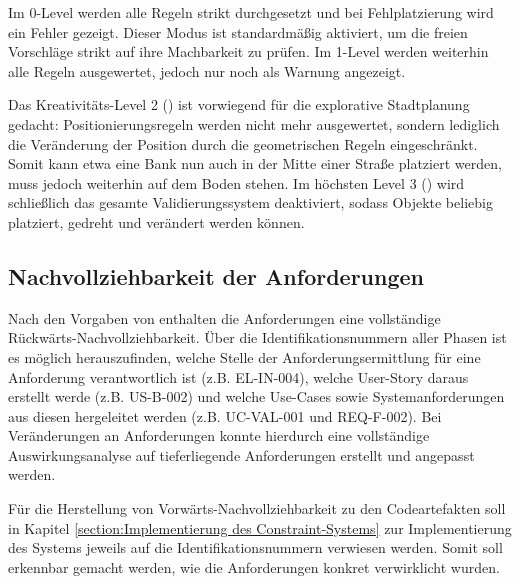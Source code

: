 Im 0-Level werden alle Regeln strikt durchgesetzt und bei Fehlplatzierung wird ein Fehler gezeigt. Dieser Modus ist standardmäßig aktiviert, um die freien Vorschläge strikt auf ihre Machbarkeit zu prüfen. Im 1-Level werden weiterhin alle Regeln ausgewertet, jedoch nur noch als Warnung angezeigt.

Das Kreativitäts-Level 2 () ist vorwiegend für die explorative Stadtplanung gedacht: Positionierungsregeln werden nicht mehr ausgewertet, sondern lediglich die Veränderung der Position durch die geometrischen Regeln eingeschränkt. Somit kann etwa eine Bank nun auch in der Mitte einer Straße platziert werden, muss jedoch weiterhin auf dem Boden stehen. Im höchsten Level 3 () wird schließlich das gesamte Validierungssystem deaktiviert, sodass Objekte beliebig platziert, gedreht und verändert werden können.

\subsection{Nachvollziehbarkeit der Anforderungen}

Nach den Vorgaben von \textcite{ruppRequirementsEngineeringUndManagement2021} enthalten die Anforderungen eine vollständige Rückwärts-Nachvollziehbarkeit. Über die Identifikationsnummern aller Phasen ist es möglich herauszufinden, welche Stelle der Anforderungsermittlung für eine Anforderung verantwortlich ist (z.B. EL-IN-004), welche User-Story daraus erstellt werde (z.B. US-B-002) und welche Use-Cases sowie Systemanforderungen aus diesen hergeleitet werden (z.B. UC-VAL-001 und REQ-F-002). Bei Veränderungen an Anforderungen konnte hierdurch eine vollständige Auswirkungsanalyse auf tieferliegende Anforderungen erstellt und angepasst werden.

Für die Herstellung von Vorwärts-Nachvollziehbarkeit zu den Codeartefakten soll in Kapitel \ref{section:Implementierung des Constraint-Systems} zur Implementierung des Systems jeweils auf die Identifikationsnummern verwiesen werden. Somit soll erkennbar gemacht werden, wie die Anforderungen konkret verwirklicht wurden.